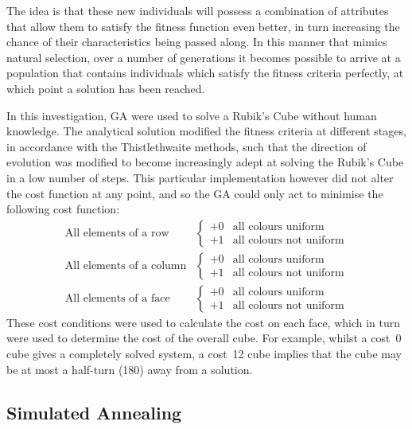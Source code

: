 \documentclass[UKenglish]{svproc}
\begin{document}
The idea is that these new individuals will possess a combination of attributes that allow them to satisfy the fitness function even better, in turn increasing the chance of their characteristics being passed along. In this manner that mimics natural selection, over a number of generations it becomes possible to arrive at a population that contains individuals which satisfy the fitness criteria perfectly, at which point a solution has been reached.

In this investigation, GA were used to solve a Rubik's Cube without human knowledge. The analytical solution modified the fitness criteria at different stages, in accordance with the Thistlethwaite methods, such that the direction of evolution was modified to become increasingly adept at solving the Rubik's Cube in a low number of steps. This particular implementation however did not alter the cost function at any point, and so the GA could only act to minimise the following cost function:
\begin{align*}
  \text{All elements of a row} &
  \begin{cases}
    +0 & \text{all colours uniform} \\
    +1 & \text{all colours not uniform}
  \end{cases} \\
  \text{All elements of a column} &
  \begin{cases}
    +0 & \text{all colours uniform} \\
    +1 & \text{all colours not uniform}
  \end{cases} \\
  \text{All elements of a face} &
  \begin{cases}
    +0 & \text{all colours uniform} \\
    +1 & \text{all colours not uniform}
  \end{cases}
\end{align*}
These cost conditions were used to calculate the cost on each face, which in turn were used to determine the cost of the overall cube. For example, whilst a cost~0 cube gives a completely solved system, a cost~12 cube implies that the cube may be at most a half-turn (180\textdegree) away from a solution.

\subsection{Simulated Annealing}
\end{document}
